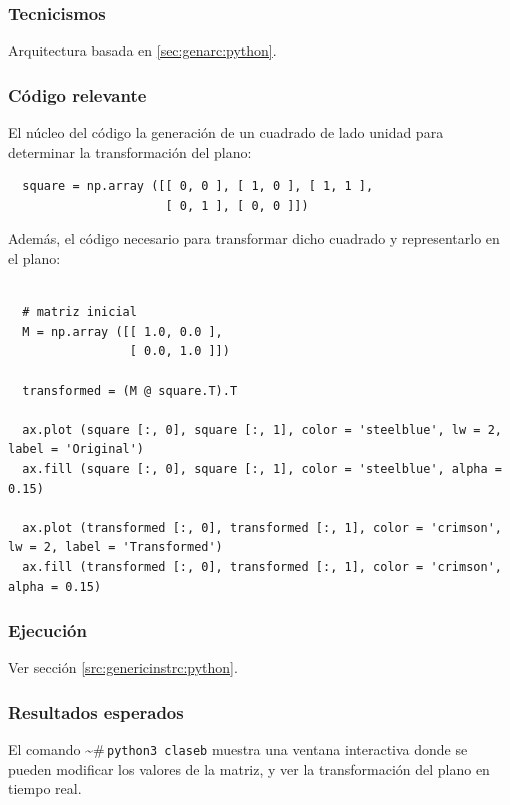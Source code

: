 \documentclass{article}[12pt,a4paper]
\newcommand{\bashps}{\textasciitilde\#\,}
\begin{document}
\subsubsection{Tecnicismos}

Arquitectura basada en \ref{sec:genarc:python}.

\subsubsection{Código relevante}

El núcleo del código la generación de un cuadrado de lado unidad para determinar la transformación del plano:

\begin{verbatim}
  square = np.array ([[ 0, 0 ], [ 1, 0 ], [ 1, 1 ],
                      [ 0, 1 ], [ 0, 0 ]])
\end{verbatim}

Además, el código necesario para transformar dicho cuadrado y representarlo en el plano:

\begin{verbatim}

  # matriz inicial
  M = np.array ([[ 1.0, 0.0 ],
                 [ 0.0, 1.0 ]])

  transformed = (M @ square.T).T

  ax.plot (square [:, 0], square [:, 1], color = 'steelblue', lw = 2, label = 'Original')
  ax.fill (square [:, 0], square [:, 1], color = 'steelblue', alpha = 0.15)

  ax.plot (transformed [:, 0], transformed [:, 1], color = 'crimson', lw = 2, label = 'Transformed')
  ax.fill (transformed [:, 0], transformed [:, 1], color = 'crimson', alpha = 0.15)

\end{verbatim}

\subsubsection{Ejecución}

Ver sección \ref{src:genericinstrc:python}.

\subsubsection{Resultados esperados}

El comando \bashps\texttt{python3 claseb} muestra una ventana interactiva donde se pueden modificar los valores de la matriz, y ver la transformación del plano en tiempo real.
\end{document}
